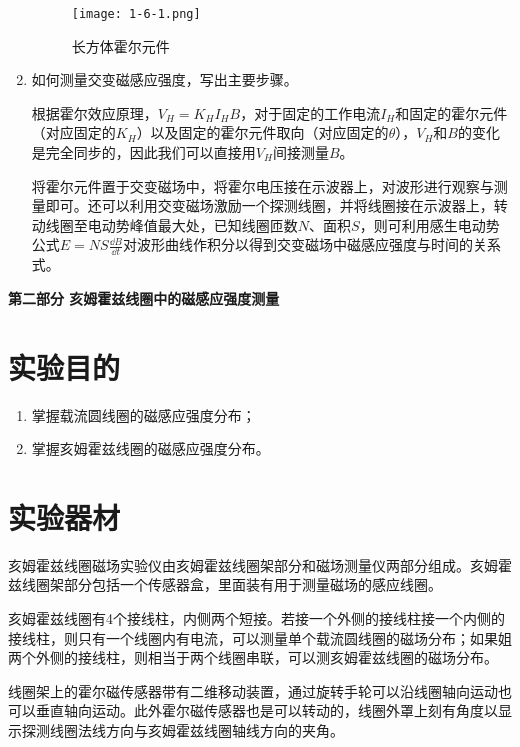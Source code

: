 \documentclass[12pt]{article}
\begin{document}
\begin{enumerate}
    \begin{figure}[htbp]
        \centering
        \texttt{[image: 1-6-1.png]}
        \caption{长方体霍尔元件}
    \end{figure}

    \item {\kaishu 如何测量交变磁感应强度，写出主要步骤。}
    
    根据霍尔效应原理，$V_H=K_HI_HB$，对于固定的工作电流$I_H$和固定的霍尔元件（对应固定的$K_H$）以及固定的霍尔元件取向（对应固定的$\theta$），$V_H$和$B$的变化是完全同步的，因此我们可以直接用$V_H$间接测量$B$。
    
    将霍尔元件置于交变磁场中，将霍尔电压接在示波器上，对波形进行观察与测量即可。还可以利用交变磁场激励一个探测线圈，并将线圈接在示波器上，转动线圈至电动势峰值最大处，已知线圈匝数$ N $、面积$ S $，则可利用感生电动势公式$ E=NS\frac{\dd B}{\dd t} $对波形曲线作积分以得到交变磁场中磁感应强度与时间的关系式。
\end{enumerate}

\setcounter{section}{0}
\newpage
\begin{center}
{\Large \textbf{第二部分 \quad 亥姆霍兹线圈中的磁感应强度测量}}
\end{center}

\section{实验目的}
\begin{enumerate}
    \item 掌握载流圆线圈的磁感应强度分布；
    \item 掌握亥姆霍兹线圈的磁感应强度分布。
\end{enumerate}

\section{实验器材}
亥姆霍兹线圈磁场实验仪由亥姆霍兹线圈架部分和磁场测量仪两部分组成。亥姆霍兹线圈架部分包括一个传感器盒，里面装有用于测量磁场的感应线圈。

亥姆霍兹线圈有4个接线柱，内侧两个短接。若接一个外侧的接线柱接一个内侧的接线柱，则只有一个线圈内有电流，可以测量单个载流圆线圈的磁场分布；如果姐两个外侧的接线柱，则相当于两个线圈串联，可以测亥姆霍兹线圈的磁场分布。

线圈架上的霍尔磁传感器带有二维移动装置，通过旋转手轮可以沿线圈轴向运动也可以垂直轴向运动。此外霍尔磁传感器也是可以转动的，线圈外罩上刻有角度以显示探测线圈法线方向与亥姆霍兹线圈轴线方向的夹角。
\end{document}
